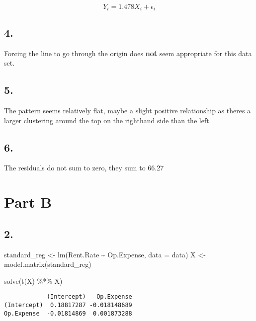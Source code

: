 \documentclass[
  letterpaper,
  DIV=11,
  numbers=noendperiod]{scrartcl}
\newenvironment{Shaded}{\begin{snugshade}}{\end{snugshade}}
\newcommand{\AttributeTok}[1]{\textcolor[rgb]{0.40,0.45,0.13}{#1}}
\newcommand{\FunctionTok}[1]{\textcolor[rgb]{0.28,0.35,0.67}{#1}}
\newcommand{\NormalTok}[1]{\textcolor[rgb]{0.00,0.23,0.31}{#1}}
\newcommand{\OtherTok}[1]{\textcolor[rgb]{0.00,0.23,0.31}{#1}}
\newcommand{\SpecialCharTok}[1]{\textcolor[rgb]{0.37,0.37,0.37}{#1}}
\begin{document}
\[
Y_i = 1.478X_i + \epsilon_i
\]

\hypertarget{section-2}{%
\subsection{4.}\label{section-2}}

Forcing the line to go through the origin does \textbf{not} seem
appropriate for this data set.

\hypertarget{section-3}{%
\subsection{5.}\label{section-3}}

The pattern seems relatively flat, maybe a slight positive relationship
as theres a larger clustering around the top on the righthand side than
the left.

\hypertarget{section-4}{%
\subsection{6.}\label{section-4}}

The residuals do not sum to zero, they sum to 66.27

\hypertarget{part-b}{%
\section{Part B}\label{part-b}}

\hypertarget{section-5}{%
\subsection{2.}\label{section-5}}

\begin{Shaded}
\begin{Highlighting}[]
\NormalTok{standard\_reg }\OtherTok{\textless{}{-}} \FunctionTok{lm}\NormalTok{(Rent.Rate }\SpecialCharTok{\textasciitilde{}}\NormalTok{ Op.Expense, }\AttributeTok{data =}\NormalTok{ data)}
\NormalTok{X }\OtherTok{\textless{}{-}} \FunctionTok{model.matrix}\NormalTok{(standard\_reg)}

\FunctionTok{solve}\NormalTok{(}\FunctionTok{t}\NormalTok{(X) }\SpecialCharTok{\%*\%}\NormalTok{ X)}
\end{Highlighting}
\end{Shaded}

\begin{verbatim}
            (Intercept)   Op.Expense
(Intercept)  0.18817287 -0.018148689
Op.Expense  -0.01814869  0.001873288
\end{verbatim}
\end{document}

